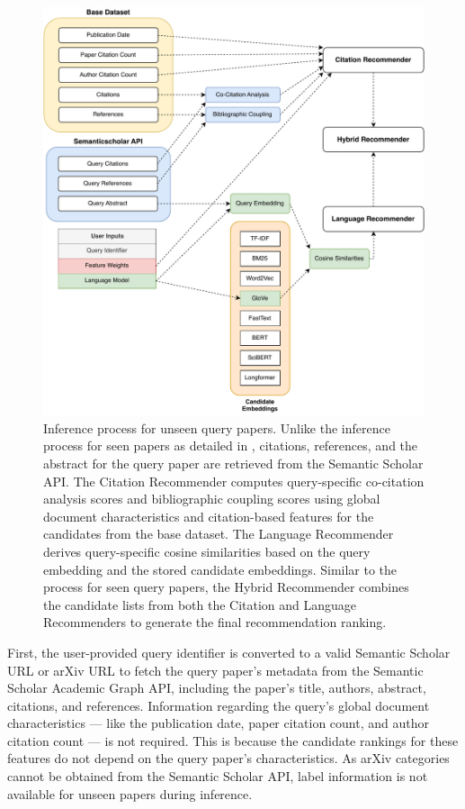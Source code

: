 \begin{figure}[htb!]
    \centering
    \includegraphics[width=\textwidth]{diagrams/inference_unseen.pdf}
    \caption[Inference for Unseen Papers]{Inference process for unseen query papers.
        Unlike the inference process for seen papers as detailed in , citations, references, and the abstract for the query paper are retrieved from the Semantic Scholar API.
        The Citation Recommender computes query-specific co-citation analysis scores and bibliographic coupling scores using global document characteristics and citation-based features for the candidates from the base dataset.
        The Language Recommender derives query-specific cosine similarities based on the query embedding and the stored candidate embeddings.
        Similar to the process for seen query papers, the Hybrid Recommender combines the candidate lists from both the Citation and Language Recommenders to generate the final recommendation ranking.}
    \label{fig:inference-unseen}
\end{figure}


First, the user-provided query identifier is converted to a valid Semantic Scholar URL or arXiv URL to fetch the query paper's metadata from the Semantic Scholar Academic Graph API, including the paper's title, authors, abstract, citations, and references.
Information regarding the query's global document characteristics — like the publication date, paper citation count, and author citation count — is not required. This is because the candidate rankings for these features do not depend on the query paper's characteristics.
As arXiv categories cannot be obtained from the Semantic Scholar API, label information is not available for unseen papers during inference.

